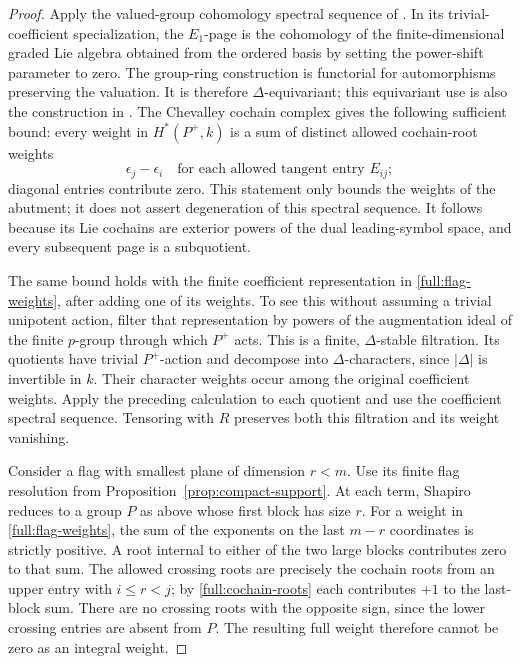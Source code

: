 \begin{proof}
Apply the valued-group cohomology spectral sequence of
\cite[Theorem~1.1]{Sorensen}.  In its trivial-coefficient
specialization, the $E_1$-page is the cohomology of the
finite-dimensional graded Lie algebra obtained from the
ordered basis by setting the power-shift parameter to zero.
The group-ring construction is functorial for automorphisms
preserving the valuation.  It is therefore $\Delta$-equivariant;
this equivariant use is also the construction in
\cite[\S3 and equation~(4.2)]{DLH}.
The Chevalley cochain complex gives the following sufficient
bound: every weight in $H^*(P^+,k)$ is a sum of distinct allowed
cochain-root weights
\begin{equation}
\label{full:cochain-roots}
 \epsilon_j-\epsilon_i
       \quad\text{for each allowed tangent entry }E_{ij};
\end{equation}
diagonal entries contribute zero.
This statement only bounds the weights of the abutment;
it does not assert degeneration of this spectral sequence.
It follows because its Lie cochains are exterior powers of
the dual leading-symbol space, and every subsequent page is
a subquotient.

The same bound holds with the finite coefficient
representation in \eqref{full:flag-weights}, after adding
one of its weights.  To see this without assuming a trivial
unipotent action, filter that representation by powers of the
augmentation ideal of the finite $p$-group through which
$P^+$ acts.  This is a finite, $\Delta$-stable filtration.
Its quotients have trivial $P^+$-action and decompose into
$\Delta$-characters, since $|\Delta|$ is invertible in $k$.
Their character weights occur among the original coefficient
weights.  Apply the preceding calculation to each quotient
and use the coefficient spectral sequence.
Tensoring with $R$ preserves both this filtration and its
weight vanishing.

Consider a flag with smallest plane of dimension $r<m$.
Use its finite flag resolution from
Proposition~\ref{prop:compact-support}.  At each term, Shapiro
reduces to a group $P$ as above whose first block has size $r$.
For a weight in \eqref{full:flag-weights}, the sum of the
exponents on the last $m-r$ coordinates is strictly positive.
A root internal to either of the two large blocks contributes
zero to that sum.  The allowed crossing roots are precisely
the cochain roots from an upper entry with
$i\leq r<j$; by \eqref{full:cochain-roots} each contributes
$+1$ to the last-block sum.  There are no crossing roots with
the opposite sign, since the lower crossing entries are
absent from $P$.  The resulting full weight therefore cannot
be zero as an integral weight.


\end{proof}
